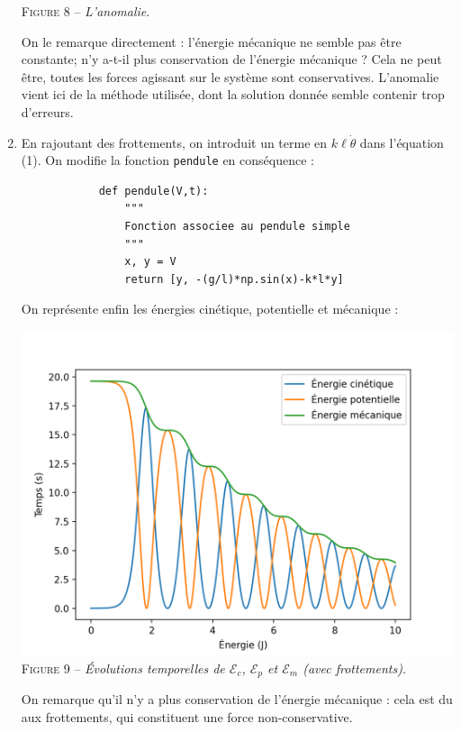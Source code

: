 \documentclass[17pt]{article}
\newcommand{\f}[1]{\texttt{#1}}
\begin{document}
\begin{enumerate}[start=13]
\begin{center}
			\textsc{Figure 8 – } \textit{L'anomalie}.
		\end{center}
		On le remarque directement : l'énergie mécanique ne semble pas être constante; n'y a-t-il plus conservation de l'énergie mécanique ? Cela ne peut être, toutes les forces agissant sur le système sont conservatives. L'anomalie vient ici de la méthode utilisée, dont la solution donnée semble contenir trop d'erreurs.
		\item En rajoutant des frottements, on introduit un terme en $k\ell\dot{\theta}$ dans l'équation (1). On modifie la fonction \f{pendule} en conséquence : 
		\begin{lstlisting}
			def pendule(V,t):
			    """
			    Fonction associee au pendule simple
			    """
			    x, y = V
			    return [y, -(g/l)*np.sin(x)-k*l*y]
		\end{lstlisting}
		On représente enfin les énergies cinétique, potentielle et mécanique : 
		\begin{center}
			\includegraphics[scale=0.4]{./img/question17.png}\\
			\textsc{Figure 9 – } \textit{Évolutions temporelles de $\mathcal{E}_c$, $\mathcal{E}_p$ et $\mathcal{E}_m$ (avec frottements)}.
		\end{center}
		On remarque qu'il n'y a plus conservation de l'énergie mécanique : cela est du aux frottements, qui constituent une force non-conservative.
	\end{enumerate}
\end{document}
